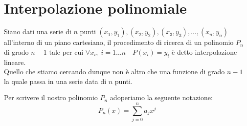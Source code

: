 \documentclass[12pt, a4paper]{book}
\theoremstyle{definition}
\begin{document}
\chapter{ Interpolazione polinomiale}
\begin{flushleft}

Siano dati una serie di $n$ punti $(x_{1}, y_{1}),(x_{2}, y_{2}),(x_{3}, y_{3}), \dots, (x_{n}, y_{n})$ all'interno di un piano cartesiano,  il procedimento di ricerca di un polinomio $P_{n}$ di grado $n-1$ tale per cui $\forall x_{i}, \; i= 1 \dots n \quad P(x_{i}) = y_{i}$ è detto interpolazione lineare.\\

Quello che stiamo cercando dunque non è altro che una funzione di grado $n-1$ la quale passa in una serie data di $n$ punti.


\begin{figure}[!h]
\centering
{}
\end{figure}


Per scrivere il nostro polinomio $P_{n}$ adoperiamo la seguente notazione: 
\[ 
	P_{n}(x) = \sum_{j=0}^{n} a_{j}x^{j}
\]


\end{flushleft}
\end{document}
